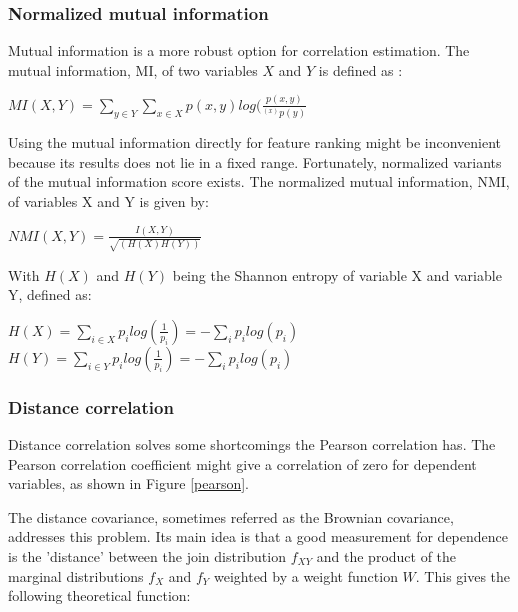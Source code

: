 \subsubsection{Normalized mutual information}
Mutual information is a more robust option for correlation estimation. The mutual information, MI, of two variables $X$ and $Y$ is defined as \citep{mutPaper}:
\begin{center}
$MI(X,Y) = \sum\limits_{y\in Y} \sum\limits_{x\in X} p(x,y)log(\frac{p(x,y)}{^(x)p(y)}$
\end{center}

\npar

Using the mutual information directly for feature ranking might be inconvenient because its results does not lie in a fixed range. Fortunately, normalized variants of the mutual information score exists. The normalized mutual information, NMI, of variables X and Y is given by:

\begin{center}
$NMI(X,Y) = \frac{I(X,Y)}{\sqrt{(H(X)H(Y))}}$
\end{center}

With $H(X)$ and $H(Y)$ being the Shannon entropy of variable X and variable Y, defined as:

\begin{center}
$H(X) = \sum\limits_{i\in X} p_ilog(\frac{1}{p_i}) = - \sum\limits_i p_ilog(p_i)$\\
$H(Y) = \sum\limits_{i\in Y} p_ilog(\frac{1}{p_i}) = - \sum\limits_i p_ilog(p_i)$

\end{center}

\clearpage

\subsubsection{Distance correlation}
Distance correlation solves some shortcomings the Pearson correlation has. The Pearson correlation coefficient might give a correlation of zero for dependent variables, as shown in Figure \ref{pearson}.


The distance covariance, sometimes referred as the Brownian covariance, addresses this problem\citep{distPaper}. Its main idea is that a good measurement for dependence is the 'distance' between the join distribution $f_{XY}$ and the product of the marginal distributions $f_X$ and $f_Y$ weighted by a weight function $W$. This gives the following theoretical function:


